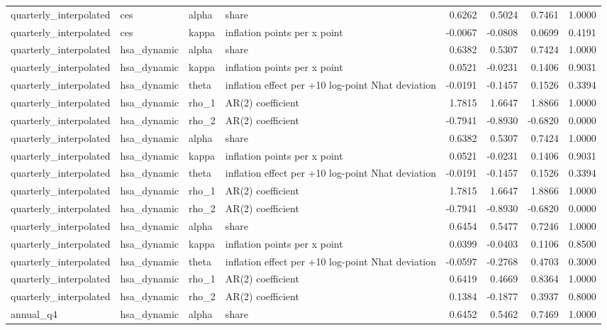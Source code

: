 \begin{tabular}{llllrrrr}
quarterly\_interpolated & ces & alpha & share & 0.6262 & 0.5024 & 0.7461 & 1.0000 \\
quarterly\_interpolated & ces & kappa & inflation points per x point & -0.0067 & -0.0808 & 0.0699 & 0.4191 \\
quarterly\_interpolated & hsa\_dynamic & alpha & share & 0.6382 & 0.5307 & 0.7424 & 1.0000 \\
quarterly\_interpolated & hsa\_dynamic & kappa & inflation points per x point & 0.0521 & -0.0231 & 0.1406 & 0.9031 \\
quarterly\_interpolated & hsa\_dynamic & theta & inflation effect per +10 log-point Nhat deviation & -0.0191 & -0.1457 & 0.1526 & 0.3394 \\
quarterly\_interpolated & hsa\_dynamic & rho\_1 & AR(2) coefficient & 1.7815 & 1.6647 & 1.8866 & 1.0000 \\
quarterly\_interpolated & hsa\_dynamic & rho\_2 & AR(2) coefficient & -0.7941 & -0.8930 & -0.6820 & 0.0000 \\
quarterly\_interpolated & hsa\_dynamic & alpha & share & 0.6382 & 0.5307 & 0.7424 & 1.0000 \\
quarterly\_interpolated & hsa\_dynamic & kappa & inflation points per x point & 0.0521 & -0.0231 & 0.1406 & 0.9031 \\
quarterly\_interpolated & hsa\_dynamic & theta & inflation effect per +10 log-point Nhat deviation & -0.0191 & -0.1457 & 0.1526 & 0.3394 \\
quarterly\_interpolated & hsa\_dynamic & rho\_1 & AR(2) coefficient & 1.7815 & 1.6647 & 1.8866 & 1.0000 \\
quarterly\_interpolated & hsa\_dynamic & rho\_2 & AR(2) coefficient & -0.7941 & -0.8930 & -0.6820 & 0.0000 \\
quarterly\_interpolated & hsa\_dynamic & alpha & share & 0.6454 & 0.5477 & 0.7246 & 1.0000 \\
quarterly\_interpolated & hsa\_dynamic & kappa & inflation points per x point & 0.0399 & -0.0403 & 0.1106 & 0.8500 \\
quarterly\_interpolated & hsa\_dynamic & theta & inflation effect per +10 log-point Nhat deviation & -0.0597 & -0.2768 & 0.4703 & 0.3000 \\
quarterly\_interpolated & hsa\_dynamic & rho\_1 & AR(2) coefficient & 0.6419 & 0.4669 & 0.8364 & 1.0000 \\
quarterly\_interpolated & hsa\_dynamic & rho\_2 & AR(2) coefficient & 0.1384 & -0.1877 & 0.3937 & 0.8000 \\
annual\_q4 & hsa\_dynamic & alpha & share & 0.6452 & 0.5462 & 0.7469 & 1.0000 \\

\end{tabular}

